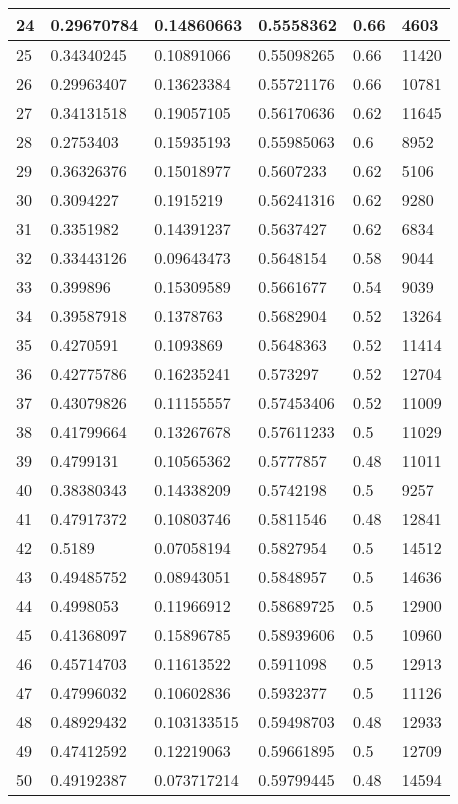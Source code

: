 \begin{longtable}{|l|l|l|l|l|l|}
24 & 0.29670784 & 0.14860663 & 0.5558362 & 0.66 & 4603 \\ \hline 
25 & 0.34340245 & 0.10891066 & 0.55098265 & 0.66 & 11420 \\ \hline 
26 & 0.29963407 & 0.13623384 & 0.55721176 & 0.66 & 10781 \\ \hline 
27 & 0.34131518 & 0.19057105 & 0.56170636 & 0.62 & 11645 \\ \hline 
28 & 0.2753403 & 0.15935193 & 0.55985063 & 0.6 & 8952 \\ \hline 
29 & 0.36326376 & 0.15018977 & 0.5607233 & 0.62 & 5106 \\ \hline 
30 & 0.3094227 & 0.1915219 & 0.56241316 & 0.62 & 9280 \\ \hline 
31 & 0.3351982 & 0.14391237 & 0.5637427 & 0.62 & 6834 \\ \hline 
32 & 0.33443126 & 0.09643473 & 0.5648154 & 0.58 & 9044 \\ \hline 
33 & 0.399896 & 0.15309589 & 0.5661677 & 0.54 & 9039 \\ \hline 
34 & 0.39587918 & 0.1378763 & 0.5682904 & 0.52 & 13264 \\ \hline 
35 & 0.4270591 & 0.1093869 & 0.5648363 & 0.52 & 11414 \\ \hline 
36 & 0.42775786 & 0.16235241 & 0.573297 & 0.52 & 12704 \\ \hline 
37 & 0.43079826 & 0.11155557 & 0.57453406 & 0.52 & 11009 \\ \hline 
38 & 0.41799664 & 0.13267678 & 0.57611233 & 0.5 & 11029 \\ \hline 
39 & 0.4799131 & 0.10565362 & 0.5777857 & 0.48 & 11011 \\ \hline 
40 & 0.38380343 & 0.14338209 & 0.5742198 & 0.5 & 9257 \\ \hline 
41 & 0.47917372 & 0.10803746 & 0.5811546 & 0.48 & 12841 \\ \hline 
42 & 0.5189 & 0.07058194 & 0.5827954 & 0.5 & 14512 \\ \hline 
43 & 0.49485752 & 0.08943051 & 0.5848957 & 0.5 & 14636 \\ \hline 
44 & 0.4998053 & 0.11966912 & 0.58689725 & 0.5 & 12900 \\ \hline 
45 & 0.41368097 & 0.15896785 & 0.58939606 & 0.5 & 10960 \\ \hline 
46 & 0.45714703 & 0.11613522 & 0.5911098 & 0.5 & 12913 \\ \hline 
47 & 0.47996032 & 0.10602836 & 0.5932377 & 0.5 & 11126 \\ \hline 
48 & 0.48929432 & 0.103133515 & 0.59498703 & 0.48 & 12933 \\ \hline 
49 & 0.47412592 & 0.12219063 & 0.59661895 & 0.5 & 12709 \\ \hline 
50 & 0.49192387 & 0.073717214 & 0.59799445 & 0.48 & 14594 \\ \hline 
\end{longtable}